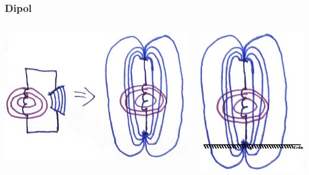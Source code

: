 \begin{frame}
    \frametitle{Dipol}
    \begin{columns}[c]
        \column[c]{5cm}
        \begin{center}
        \includegraphics[width=1\textwidth]{a08/emagfeld1.png}\\
    \end{center}
    \column{5cm} \large
        \begin{center}
        \includegraphics[width=1\textwidth]{a08/emagfeld2.png}\\
    \end{center}
    \end{columns}
\end{frame}

